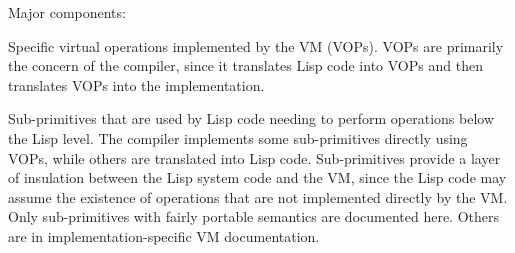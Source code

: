 Major components:
\begin{itemize}
Specific virtual operations implemented by the VM (VOPs).  VOPs are primarily
the concern of the compiler, since it translates Lisp code into VOPs and then
translates VOPs into the implementation.

Sub-primitives that are used by Lisp code needing to perform operations
below the Lisp level.  The compiler implements some sub-primitives directly
using VOPs, while others are translated into Lisp code.  Sub-primitives provide
a layer of insulation between the Lisp system code and the VM, since the Lisp
code may assume the existence of operations that are not implemented directly
by the VM.  Only sub-primitives with fairly portable semantics are documented
here.  Others are in implementation-specific VM documentation.
\end{itemize}

